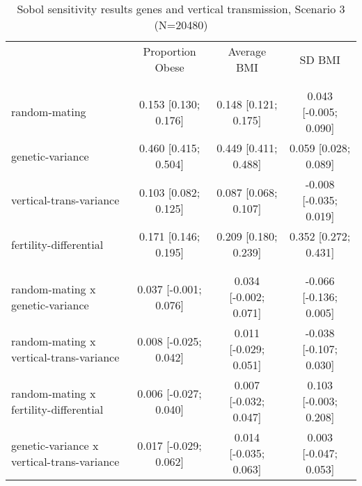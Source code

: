 
    \begin{table}[htp]
    \renewcommand{\arraystretch}{1.3}
    \setlength{\tabcolsep}{5pt}
    \caption{Sobol sensitivity results genes and vertical transmission, Scenario 3 (N=20480)}
    \label{tab:sobol-snp-vt}
    \footnotesize
    \centering
    \begin{threeparttable}
    \begin{tabular}{lccc}
    \hline
    \addlinespace
    & Proportion Obese & Average BMI & SD BMI \\
    \addlinespace
    \hline
    \addlinespace
    \multicolumn{4}{l}{\textbf{Scenario 3 (genes and vertical transmission)}} \\
    \addlinespace[6pt]
    \multicolumn{4}{l}{\hspace{1em} S1} \\
\hspace{1.5em} random-mating & 0.153 [0.130; 0.176]   & 0.148 [0.121; 0.175]   & 0.043 [-0.005; 0.090] \\
	  \hspace{1.5em} genetic-variance & 0.460 [0.415; 0.504]   & 0.449 [0.411; 0.488]   & 0.059 [0.028; 0.089] \\
	  \hspace{1.5em} vertical-trans-variance & 0.103 [0.082; 0.125]   & 0.087 [0.068; 0.107]   & -0.008 [-0.035; 0.019] \\
	  \hspace{1.5em} fertility-differential & 0.171 [0.146; 0.195]   & 0.209 [0.180; 0.239]   & 0.352 [0.272; 0.431] \\
	 \\
    \addlinespace[12pt]
    \multicolumn{4}{l}{\hspace{1em} S2} \\ 
\hspace{1.5em} random-mating x genetic-variance & 0.037 [-0.001; 0.076]   & 0.034 [-0.002; 0.071]   & -0.066 [-0.136; 0.005] \\
	  \hspace{1.5em} random-mating x vertical-trans-variance & 0.008 [-0.025; 0.042]   & 0.011 [-0.029; 0.051]   & -0.038 [-0.107; 0.030] \\
	  \hspace{1.5em} random-mating x fertility-differential & 0.006 [-0.027; 0.040]   & 0.007 [-0.032; 0.047]   & 0.103 [-0.003; 0.208] \\
	  \hspace{1.5em} genetic-variance x vertical-trans-variance & 0.017 [-0.029; 0.062]   & 0.014 [-0.035; 0.063]   & 0.003 [-0.047; 0.053] \\

\end{tabular}
\end{threeparttable}
\end{table}
